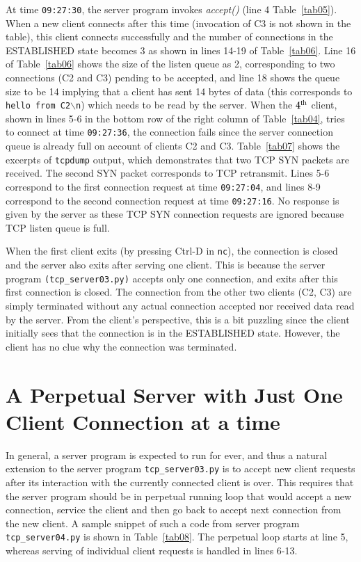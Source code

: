 \begin{multicols}{2}

At time \texttt{09:27:30}, the server program invokes \textit{accept()} (line 4 Table~\ref{tab05}). When a new client connects after this time (invocation of C3 is not shown in the table), this client connects successfully and the number of connections in the ESTABLISHED state becomes 3 as shown in lines 14-19 of Table~\ref{tab06}. Line 16 of Table~\ref{tab06} shows the size of the listen queue as 2, corresponding to two connections (C2 and C3) pending to be accepted, and line 18 shows the queue size to be 14 implying that a client has sent 14 bytes of data (this corresponds to \texttt{hello from C2$\backslash$n}) which needs to be read by the server. When the $4^{\rm th}$ client, shown in lines 5-6 in the bottom row of the right column of Table~\ref{tab04}, tries to connect at time \texttt{09:27:36}, the connection fails since the server connection queue is already full on account of clients C2 and C3. Table~\ref{tab07} shows the excerpts of \texttt{tcpdump} output, which demonstrates that two TCP SYN packets are received. The second SYN packet corresponds to TCP retransmit. Lines 5-6 correspond to the first connection request at time \texttt{09:27:04}, and lines 8-9 correspond to the second connection request at time \texttt{09:27:16}. No response is given by the server as these TCP SYN connection requests are ignored because TCP listen queue is full.

When the first client exits (by pressing Ctrl-D in \texttt{nc}), the connection is closed and the server also exits after serving one client. This is because the server program \texttt{(tcp\_server03.py)} accepts only one connection, and exits after this first connection is closed. The connection from the other two clients (C2, C3) are simply terminated without any actual connection accepted nor received data read by the server. From the client’s perspective, this is a bit puzzling since the client initially sees that the connection is in the ESTABLISHED state. However, the client has no clue why the connection was terminated.

\setcounter{section}{4}
\section{A Perpetual Server with Just One Client Connection at a time}

In general, a server program is expected to run for ever, and thus a natural extension to the server program \texttt{tcp\_server03.py} is to accept new client requests after its interaction with the currently connected client is over. This requires that the server program should be in perpetual running loop that would accept a new connection, service the client and then go back to accept next connection from the new client. A sample snippet of such a code from server program \texttt{tcp\_server04.py} \cite{art1-key17} is shown in Table~\ref{tab08}. The perpetual loop starts at line 5, whereas serving of individual client requests is handled in lines 6-13.


\end{multicols}
